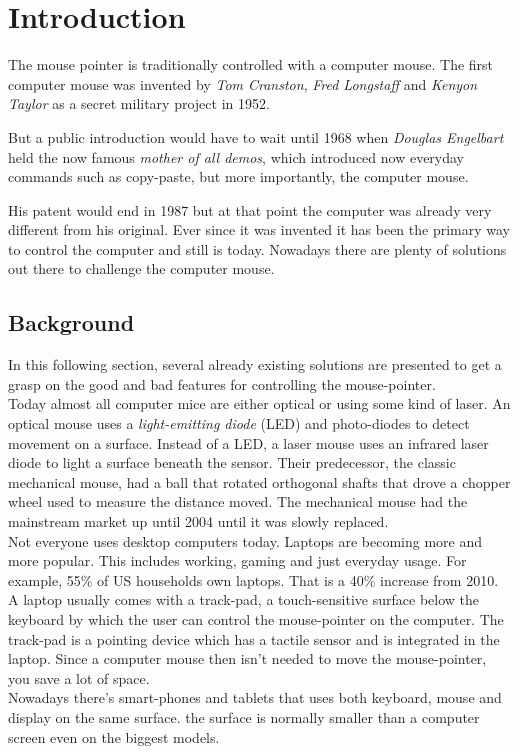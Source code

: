 \chapter{Introduction}
The mouse pointer is traditionally controlled with a computer mouse.
The first computer mouse was invented by \emph{Tom Cranston}, \emph{Fred Longstaff} and 
\emph{Kenyon Taylor} as a secret military project in 1952. 

But a public introduction would have to wait until 1968 when \emph{Douglas Engelbart} held the now famous \emph{mother of all demos},
which introduced now everyday commands such as copy-paste, but more importantly, the computer mouse.



His patent would end in 1987 but at that point the computer was already very different from his original. Ever since
it was invented it has been the primary way to control the computer and still is today. Nowadays
there are plenty of solutions out there to challenge the computer mouse.\cite{Mouse40} \cite{Pioneers}

\section{Background}
In this following section, several already existing solutions are presented to get a 
grasp on the good and bad features for controlling the mouse-pointer.\\
Today almost all computer mice are either optical or using some kind of laser. An optical
mouse uses a \emph{light-emitting diode} (LED) and photo-diodes to detect movement on a
surface. Instead of a LED, a laser mouse uses an infrared laser diode to light a surface
beneath the sensor. Their predecessor, the classic mechanical mouse, had a ball that rotated
orthogonal shafts that drove a chopper wheel used to measure the distance moved. The mechanical
mouse had the mainstream market up until 2004 until it was slowly replaced.\\
Not everyone uses desktop computers today. Laptops are becoming more and more popular.
This includes working, gaming and just everyday usage. For example, 55\% of US households
own laptops. That is a 40\% increase from 2010.\\
A laptop usually comes with a track-pad, a touch-sensitive surface below the keyboard
by which the user can control the mouse-pointer on the computer.
The track-pad is a pointing device which has a tactile sensor and is
integrated in the laptop. Since a computer mouse then isn't needed to move
the mouse-pointer, you save a lot of space.\\
Nowadays there's smart-phones and tablets that uses both keyboard, mouse
and display on the same surface. the surface is normally smaller than a computer screen
even on the biggest models.

